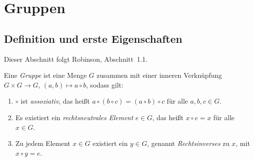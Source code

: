 \documentclass[11pt]{article}
\begin{document}

\tableofcontents
\newpage

\section{Gruppen}

\subsection{Definition und erste Eigenschaften}

Dieser Abschnitt folgt Robinson, Abschnitt~1.1.

\begin{definition}[Gruppe]\Theorem
  Eine \emph{Gruppe} ist eine Menge $G$ zusammen mit einer inneren Verknüpfung $G \times G \to G$, $(a, b) \mapsto a \circ b$, sodass gilt:
  \begin{enumerate}[label=(\roman*)]
    \item $\circ$ ist \emph{assoziativ}, das heißt $a \circ (b \circ c) = (a \circ b) \circ c$ für alle $a, b, c \in G$.
    \item Es existiert ein \emph{rechtsneutrales Element} $e \in G$, das heißt $x \circ e = x$ für alle $x \in G$.
    \item Zu jedem Element $x \in G$ existiert ein $y \in G$, genannt \emph{Rechtsinverses} zu $x$, mit $x \circ y = e$.
  \end{enumerate}
\end{definition}
\end{document}
